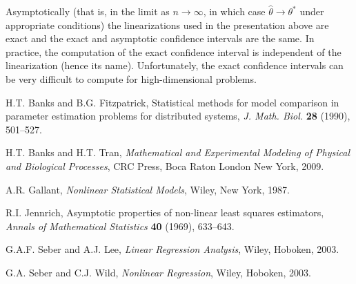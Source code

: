 \documentclass[10pt]{article}
\begin{document}
Asymptotically (that is, in the limit as $n \to \infty$, in which case $\hat{\theta} \to \theta^{*}$ under appropriate conditions) the linearizations used in the presentation above are exact and the exact and asymptotic confidence intervals are the same.  In practice, the computation of the exact confidence interval is independent of the linearization (hence its name).  Unfortunately, the exact confidence intervals can be very difficult to compute for high-dimensional problems.










\begin{thebibliography}{99}

 H.T. Banks and B.G. Fitzpatrick, Statistical methods for model comparison in parameter estimation problems for distributed systems, \emph{J. Math. Biol.} \textbf{28} (1990), 501--527.

 H.T. Banks and H.T. Tran, \emph{Mathematical and Experimental Modeling of Physical and Biological Processes}, CRC Press, Boca Raton London New York, 2009.

 A.R. Gallant, \emph{Nonlinear Statistical Models}, Wiley, New York, 1987.

 R.I. Jennrich, Asymptotic properties of non-linear least squares estimators, \emph{Annals of Mathematical Statistics} \textbf{40} (1969), 633--643.

 G.A.F. Seber and A.J. Lee, \emph{Linear Regression Analysis}, Wiley, Hoboken, 2003.

 G.A. Seber and C.J. Wild, \emph{Nonlinear Regression}, Wiley, Hoboken, 2003. 

\end{thebibliography}
\end{document}

